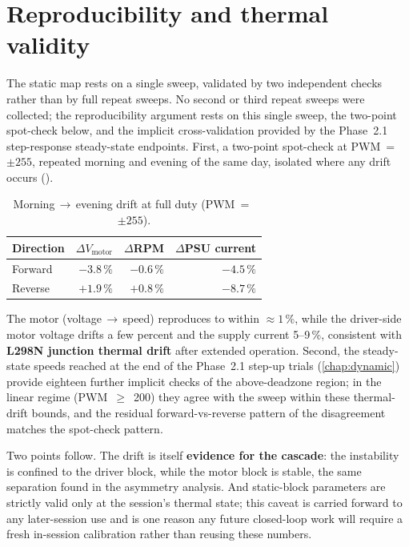 \section{Reproducibility and thermal validity}
\label{sec:static-repro}

The static map rests on a single sweep, validated by two independent checks rather than by full repeat sweeps. No second or third repeat sweeps were collected; the reproducibility argument rests on this single sweep, the two-point spot-check below, and the implicit cross-validation provided by the Phase~2.1 step-response steady-state endpoints. First, a two-point spot-check at PWM~=~$\pm 255$, repeated morning and evening of the same day, isolated where any drift occurs ().

\begin{table}[t]
  \centering
  \caption{Morning\,$\to$\,evening drift at full duty (PWM~=~$\pm 255$).}
  \label{tab:drift}
  \begin{tabular}{@{}lrrr@{}}
    \toprule
    Direction & $\Delta V_{\mathrm{motor}}$ & $\Delta$RPM & $\Delta$PSU current \\
    \midrule
    Forward & $-3.8\,\%$ & $-0.6\,\%$ & $-4.5\,\%$ \\
    Reverse & $+1.9\,\%$ & $+0.8\,\%$ & $-8.7\,\%$ \\
    \bottomrule
  \end{tabular}
\end{table}

The motor (voltage\,$\to$\,speed) reproduces to within ${\approx}1\,\%$, while the driver-side motor voltage drifts a few percent and the supply current 5--9\,\%, consistent with \textbf{L298N junction thermal drift} after extended operation. Second, the steady-state speeds reached at the end of the Phase~2.1 step-up trials (\cref{chap:dynamic}) provide eighteen further implicit checks of the above-deadzone region; in the linear regime (PWM~$\ge$~200) they agree with the sweep within these thermal-drift bounds, and the residual forward-vs-reverse pattern of the disagreement matches the spot-check pattern.

Two points follow. The drift is itself \textbf{evidence for the cascade}: the instability is confined to the driver block, while the motor block is stable, the same separation found in the asymmetry analysis. And static-block parameters are strictly valid only at the session's thermal state; this caveat is carried forward to any later-session use and is one reason any future closed-loop work will require a fresh in-session calibration rather than reusing these numbers.

